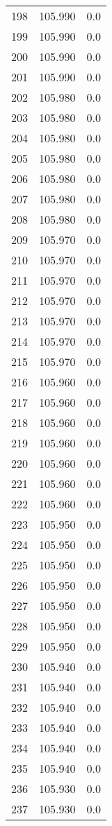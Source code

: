 \begin{tabular}{lrr}
198 &  105.990 &   0.0 \\
199 &  105.990 &   0.0 \\
200 &  105.990 &   0.0 \\
201 &  105.990 &   0.0 \\
202 &  105.980 &   0.0 \\
203 &  105.980 &   0.0 \\
204 &  105.980 &   0.0 \\
205 &  105.980 &   0.0 \\
206 &  105.980 &   0.0 \\
207 &  105.980 &   0.0 \\
208 &  105.980 &   0.0 \\
209 &  105.970 &   0.0 \\
210 &  105.970 &   0.0 \\
211 &  105.970 &   0.0 \\
212 &  105.970 &   0.0 \\
213 &  105.970 &   0.0 \\
214 &  105.970 &   0.0 \\
215 &  105.970 &   0.0 \\
216 &  105.960 &   0.0 \\
217 &  105.960 &   0.0 \\
218 &  105.960 &   0.0 \\
219 &  105.960 &   0.0 \\
220 &  105.960 &   0.0 \\
221 &  105.960 &   0.0 \\
222 &  105.960 &   0.0 \\
223 &  105.950 &   0.0 \\
224 &  105.950 &   0.0 \\
225 &  105.950 &   0.0 \\
226 &  105.950 &   0.0 \\
227 &  105.950 &   0.0 \\
228 &  105.950 &   0.0 \\
229 &  105.950 &   0.0 \\
230 &  105.940 &   0.0 \\
231 &  105.940 &   0.0 \\
232 &  105.940 &   0.0 \\
233 &  105.940 &   0.0 \\
234 &  105.940 &   0.0 \\
235 &  105.940 &   0.0 \\
236 &  105.930 &   0.0 \\
237 &  105.930 &   0.0 \\

\end{tabular}
